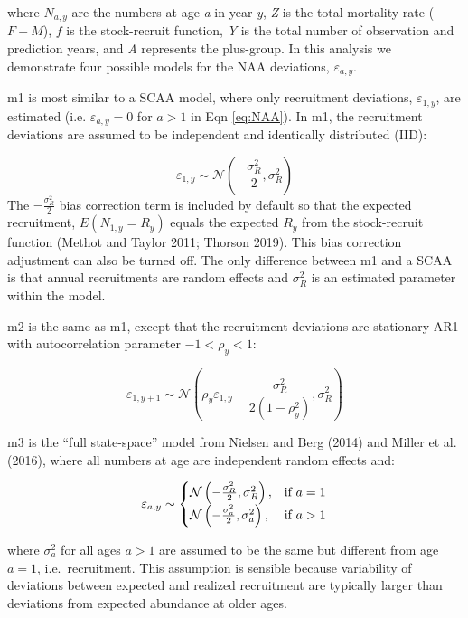 \documentclass[]{article}
\begin{document}
where \(N_{a,y}\) are the numbers at age \emph{a} in year \emph{y},
\emph{Z} is the total mortality rate (\(F + M\)), \(f\) is the
stock-recruit function, \emph{Y} is the total number of observation and
prediction years, and \emph{A} represents the plus-group. In this
analysis we demonstrate four possible models for the NAA deviations,
\(\varepsilon_{a,y}\).

m1 is most similar to a SCAA model, where only recruitment deviations,
\(\varepsilon_{1,y}\), are estimated (i.e. \(\varepsilon_{a,y} = 0\) for
\(a > 1\) in Eqn \ref{eq:NAA}). In m1, the recruitment deviations are
assumed to be independent and identically distributed (IID):

\[\varepsilon_{1,y} \sim \mathcal{N}\left( - \frac{\sigma^2_R}{2}, \sigma^2_R \right)\]
The \(- \frac{\sigma^2_R}{2}\) bias correction term is included by
default so that the expected recruitment, \(E(N_{1,y} = R_y)\) equals
the expected \(R_y\) from the stock-recruit function (Methot and Taylor
2011; Thorson 2019). This bias correction adjustment can also be turned
off. The only difference between m1 and a SCAA is that annual
recruitments are random effects and \(\sigma^2_R\) is an estimated
parameter within the model.

m2 is the same as m1, except that the recruitment deviations are
stationary AR1 with autocorrelation parameter \(-1<\rho_y<1\):

\[\varepsilon_{1,y+1} \sim \mathcal{N}\left(\rho_y \varepsilon_{1,y} - \frac{\sigma^2_R}{2 (1-\rho^2_y)}, \sigma^2_R \right)\]

m3 is the ``full state-space'' model from Nielsen and Berg (2014) and
Miller et al. (2016), where all numbers at age are independent random
effects and:

\begin{equation}
  \varepsilon_{a,y} \sim \left\{
    \begin{array}{@{}ll@{}}
      \mathcal{N} \left( - \frac{\sigma^2_R}{2}, \sigma^2_R \right), & \text{if}\ a = 1 \\
      \mathcal{N} \left( - \frac{\sigma^2_a}{2}, \sigma^2_a \right), & \text{if}\ a > 1
    \end{array}\right.
\end{equation}

where \(\sigma^2_a\) for all ages \(a > 1\) are assumed to be the same
but different from age \(a = 1\), i.e.~recruitment. This assumption is
sensible because variability of deviations between expected and realized
recruitment are typically larger than deviations from expected abundance
at older ages.
\end{document}
